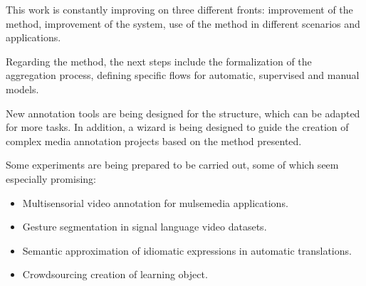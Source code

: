 This work is constantly improving on three different fronts: improvement of the method, improvement of the system, use of the method in different scenarios and applications.

Regarding the method, the next steps include the formalization of the aggregation process, defining specific flows for automatic, supervised and manual models.

New annotation tools are being designed for the structure, which can be adapted for more tasks. In addition, a wizard is being designed to guide the creation of complex media annotation projects based on the method presented.

Some experiments are being prepared to be carried out, some of which seem especially promising:
\begin{itemize}
\item Multisensorial video annotation for mulsemedia applications.
\item Gesture segmentation in signal language video datasets.
\item Semantic approximation of idiomatic expressions in automatic translations.
\item Crowdsourcing  creation of learning object.
\end{itemize}
